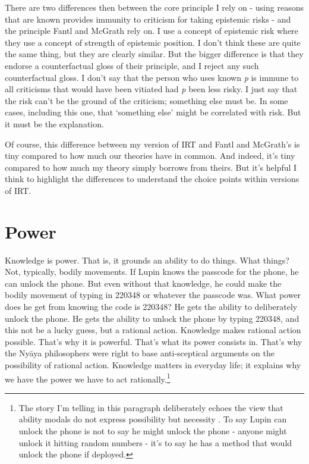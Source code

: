 \documentclass[
  11pt,
]{book}
\begin{document}
There are two differences then between the core principle I rely on - using reasons that are known provides immunity to criticism for taking epistemic risks - and the principle Fantl and McGrath rely on. I use a concept of epistemic risk where they use a concept of strength of epistemic position. I don't think these are quite the same thing, but they are clearly similar. But the bigger difference is that they endorse a counterfactual gloss of their principle, and I reject any such counterfactual gloss. I don't say that the person who uses known \emph{p} is immune to all criticisms that would have been vitiated had \emph{p} been less risky. I just say that the risk can't be the ground of the criticism; something else must be. In some cases, including this one, that `something else' might be correlated with risk. But it must be the explanation.

Of course, this difference between my version of IRT and Fantl and McGrath's is tiny compared to how much our theories have in common. And indeed, it's tiny compared to how much my theory simply borrows from theirs. But it's helpful I think to highlight the differences to understand the choice points within versions of IRT.

\hypertarget{power}{%
\chapter{Power}\label{power}}

Knowledge is power. That is, it grounds an ability to do things. What things? Not, typically, bodily movements. If Lupin knows the passcode for the phone, he can unlock the phone. But even without that knowledge, he could make the bodily movement of typing in 220348 or whatever the passcode was. What power does he get from knowing the code is 220348? He gets the ability to deliberately unlock the phone. He gets the ability to unlock the phone by typing 220348, and this not be a lucky guess, but a rational action. Knowledge makes rational action possible. That's why it is powerful. That's what its power consists in. That's why the Nyāya philosophers were right to base anti-sceptical arguments on the possibility of rational action. Knowledge matters in everyday life; it explains why we have the power we have to act rationally.\footnote{The story I'm telling in this paragraph deliberately echoes the view that ability modals do not express possibility but necessity \citep{MandelkernEtAl2017}. To say Lupin can unlock the phone is not to say he might unlock the phone - anyone might unlock it hitting random numbers - it's to say he has a method that would unlock the phone if deployed.}
\end{document}
